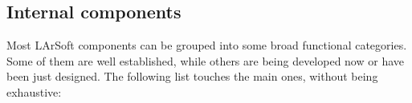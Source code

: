 \subsection{Internal components}
\label{ssec:Components}

Most LArSoft components can be grouped into some broad functional categories.
Some of them are well established, while others are being developed now or have been just designed.
The following list touches the main ones, without being exhaustive:
